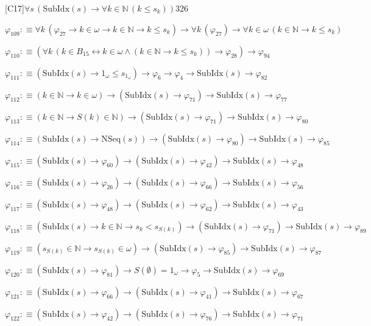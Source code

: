 \begin{fullproof}{[C17]}{$\forall s\,(\mathrm{SubIdx}(s) \to \forall k \in \mathbb{N}\,(k \leq s_{k}))$}{326}
\begin{abbrevlist}
\item $\varphi_{109} :\equiv \forall k\,(\varphi_{27} \to k \in \omega \to k \in \mathbb{N} \to k \leq s_{k}) \to \forall k\,(\varphi_{27}) \to \forall k \in \omega\,(k \in \mathbb{N} \to k \leq s_{k})$
\item $\varphi_{110} :\equiv (\forall k\,(k \in B_{15} \leftrightarrow k \in \omega \land (k \in \mathbb{N} \to k \leq s_{k})) \to \varphi_{28}) \to \varphi_{94}$
\item $\varphi_{111} :\equiv (\mathrm{SubIdx}(s) \to 1_{\omega} \leq s_{1_{\omega}}) \to \varphi_{6} \to \varphi_{4} \to \mathrm{SubIdx}(s) \to \varphi_{82}$
\item $\varphi_{112} :\equiv (k \in \mathbb{N} \to k \in \omega) \to (\mathrm{SubIdx}(s) \to \varphi_{71}) \to \mathrm{SubIdx}(s) \to \varphi_{77}$
\item $\varphi_{113} :\equiv (k \in \mathbb{N} \to S(k) \in \mathbb{N}) \to (\mathrm{SubIdx}(s) \to \varphi_{71}) \to \mathrm{SubIdx}(s) \to \varphi_{80}$
\item $\varphi_{114} :\equiv (\mathrm{SubIdx}(s) \to \mathrm{NSeq}(s)) \to (\mathrm{SubIdx}(s) \to \varphi_{80}) \to \mathrm{SubIdx}(s) \to \varphi_{85}$
\item $\varphi_{115} :\equiv (\mathrm{SubIdx}(s) \to \varphi_{60}) \to (\mathrm{SubIdx}(s) \to \varphi_{42}) \to \mathrm{SubIdx}(s) \to \varphi_{48}$
\item $\varphi_{116} :\equiv (\mathrm{SubIdx}(s) \to \varphi_{26}) \to (\mathrm{SubIdx}(s) \to \varphi_{66}) \to \mathrm{SubIdx}(s) \to \varphi_{56}$
\item $\varphi_{117} :\equiv (\mathrm{SubIdx}(s) \to \varphi_{48}) \to (\mathrm{SubIdx}(s) \to \varphi_{62}) \to \mathrm{SubIdx}(s) \to \varphi_{43}$
\item $\varphi_{118} :\equiv (\mathrm{SubIdx}(s) \to k \in \mathbb{N} \to s_{k} < s_{S(k)}) \to (\mathrm{SubIdx}(s) \to \varphi_{71}) \to \mathrm{SubIdx}(s) \to \varphi_{89}$
\item $\varphi_{119} :\equiv (s_{S(k)} \in \mathbb{N} \to s_{S(k)} \in \omega) \to (\mathrm{SubIdx}(s) \to \varphi_{85}) \to \mathrm{SubIdx}(s) \to \varphi_{87}$
\item $\varphi_{120} :\equiv (\mathrm{SubIdx}(s) \to \varphi_{81}) \to S(\emptyset) = 1_{\omega} \to \varphi_{5} \to \mathrm{SubIdx}(s) \to \varphi_{69}$
\item $\varphi_{121} :\equiv (\mathrm{SubIdx}(s) \to \varphi_{66}) \to (\mathrm{SubIdx}(s) \to \varphi_{41}) \to \mathrm{SubIdx}(s) \to \varphi_{67}$
\item $\varphi_{122} :\equiv (\mathrm{SubIdx}(s) \to \varphi_{42}) \to (\mathrm{SubIdx}(s) \to \varphi_{76}) \to \mathrm{SubIdx}(s) \to \varphi_{71}$

\end{abbrevlist}
\end{fullproof}
